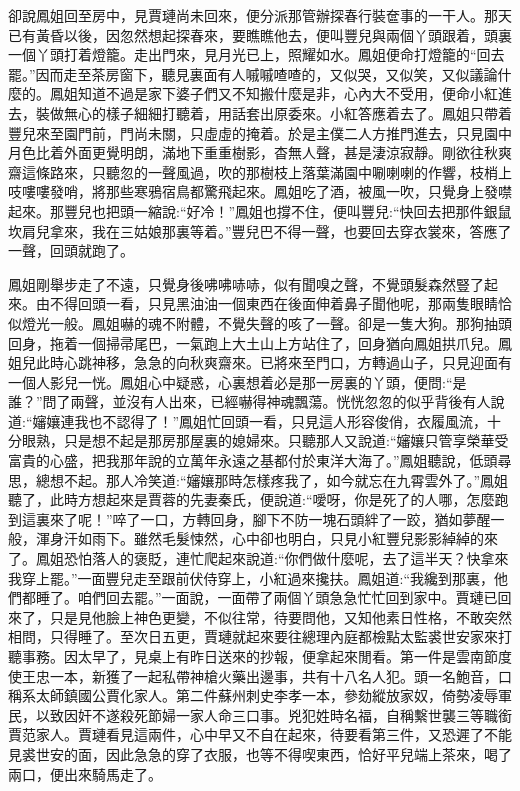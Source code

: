 

\begin{parag}
    卻說鳳姐回至房中，見賈璉尚未回來，便分派那管辦探春行裝奩事的一干人。那天已有黃昏以後，因忽然想起探春來，要瞧瞧他去，便叫豐兒與兩個丫頭跟着，頭裏一個丫頭打着燈籠。走出門來，見月光已上，照耀如水。鳳姐便命打燈籠的“回去罷。”因而走至茶房窗下，聽見裏面有人嘁嘁喳喳的，又似哭，又似笑，又似議論什麼的。鳳姐知道不過是家下婆子們又不知搬什麼是非，心內大不受用，便命小紅進去，裝做無心的樣子細細打聽着，用話套出原委來。小紅答應着去了。鳳姐只帶着豐兒來至園門前，門尚未關，只虛虛的掩着。於是主僕二人方推門進去，只見園中月色比着外面更覺明朗，滿地下重重樹影，杳無人聲，甚是淒涼寂靜。剛欲往秋爽齋這條路來，只聽忽的一聲風過，吹的那樹枝上落葉滿園中唰喇喇的作響，枝梢上吱嘍嘍發哨，將那些寒鴉宿鳥都驚飛起來。鳳姐吃了酒，被風一吹，只覺身上發噤起來。那豐兒也把頭一縮說:“好冷！”鳳姐也撐不住，便叫豐兒:“快回去把那件銀鼠坎肩兒拿來，我在三姑娘那裏等着。”豐兒巴不得一聲，也要回去穿衣裳來，答應了一聲，回頭就跑了。
\end{parag}


\begin{parag}
    鳳姐剛舉步走了不遠，只覺身後咈咈哧哧，似有聞嗅之聲，不覺頭髮森然豎了起來。由不得回頭一看，只見黑油油一個東西在後面伸着鼻子聞他呢，那兩隻眼睛恰似燈光一般。鳳姐嚇的魂不附體，不覺失聲的咳了一聲。卻是一隻大狗。那狗抽頭回身，拖着一個掃帚尾巴，一氣跑上大土山上方站住了，回身猶向鳳姐拱爪兒。鳳姐兒此時心跳神移，急急的向秋爽齋來。已將來至門口，方轉過山子，只見迎面有一個人影兒一恍。鳳姐心中疑惑，心裏想着必是那一房裏的丫頭，便問:“是誰？”問了兩聲，並沒有人出來，已經嚇得神魂飄蕩。恍恍忽忽的似乎背後有人說道:“嬸孃連我也不認得了！”鳳姐忙回頭一看，只見這人形容俊俏，衣履風流，十分眼熟，只是想不起是那房那屋裏的媳婦來。只聽那人又說道:“嬸孃只管享榮華受富貴的心盛，把我那年說的立萬年永遠之基都付於東洋大海了。”鳳姐聽說，低頭尋思，總想不起。那人冷笑道:“嬸孃那時怎樣疼我了，如今就忘在九霄雲外了。”鳳姐聽了，此時方想起來是賈蓉的先妻秦氏，便說道:“噯呀，你是死了的人哪，怎麼跑到這裏來了呢！”啐了一口，方轉回身，腳下不防一塊石頭絆了一跤，猶如夢醒一般，渾身汗如雨下。雖然毛髮悚然，心中卻也明白，只見小紅豐兒影影綽綽的來了。鳳姐恐怕落人的褒貶，連忙爬起來說道:“你們做什麼呢，去了這半天？快拿來我穿上罷。”一面豐兒走至跟前伏侍穿上，小紅過來攙扶。鳳姐道:“我纔到那裏，他們都睡了。咱們回去罷。”一面說，一面帶了兩個丫頭急急忙忙回到家中。賈璉已回來了，只是見他臉上神色更變，不似往常，待要問他，又知他素日性格，不敢突然相問，只得睡了。至次日五更，賈璉就起來要往總理內庭都檢點太監裘世安家來打聽事務。因太早了，見桌上有昨日送來的抄報，便拿起來閒看。第一件是雲南節度使王忠一本，新獲了一起私帶神槍火藥出邊事，共有十八名人犯。頭一名鮑音，口稱系太師鎮國公賈化家人。第二件蘇州刺史李孝一本，參劾縱放家奴，倚勢凌辱軍民，以致因奸不遂殺死節婦一家人命三口事。兇犯姓時名福，自稱繫世襲三等職銜賈范家人。賈璉看見這兩件，心中早又不自在起來，待要看第三件，又恐遲了不能見裘世安的面，因此急急的穿了衣服，也等不得喫東西，恰好平兒端上茶來，喝了兩口，便出來騎馬走了。
\end{parag}


